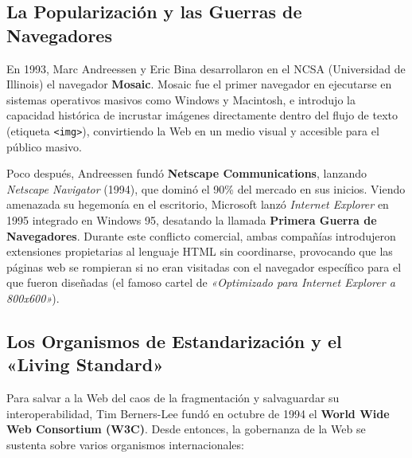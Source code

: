 \subsection{La Popularización y las Guerras de Navegadores}

En 1993, Marc Andreessen y Eric Bina desarrollaron en el NCSA (Universidad de Illinois) el navegador \textbf{Mosaic}. Mosaic fue el primer navegador en ejecutarse en sistemas operativos masivos como Windows y Macintosh, e introdujo la capacidad histórica de incrustar imágenes directamente dentro del flujo de texto (etiqueta \texttt{<img>}), convirtiendo la Web en un medio visual y accesible para el público masivo.

Poco después, Andreessen fundó \textbf{Netscape Communications}, lanzando \textit{Netscape Navigator} (1994), que dominó el 90\% del mercado en sus inicios. Viendo amenazada su hegemonía en el escritorio, Microsoft lanzó \textit{Internet Explorer} en 1995 integrado en Windows 95, desatando la llamada \textbf{Primera Guerra de Navegadores}. Durante este conflicto comercial, ambas compañías introdujeron extensiones propietarias al lenguaje HTML sin coordinarse, provocando que las páginas web se rompieran si no eran visitadas con el navegador específico para el que fueron diseñadas (el famoso cartel de \textit{«Optimizado para Internet Explorer a 800x600»}).

\subsection{Los Organismos de Estandarización y el «Living Standard»}

Para salvar a la Web del caos de la fragmentación y salvaguardar su interoperabilidad, Tim Berners-Lee fundó en octubre de 1994 el \textbf{World Wide Web Consortium (W3C)}. Desde entonces, la gobernanza de la Web se sustenta sobre varios organismos internacionales:


